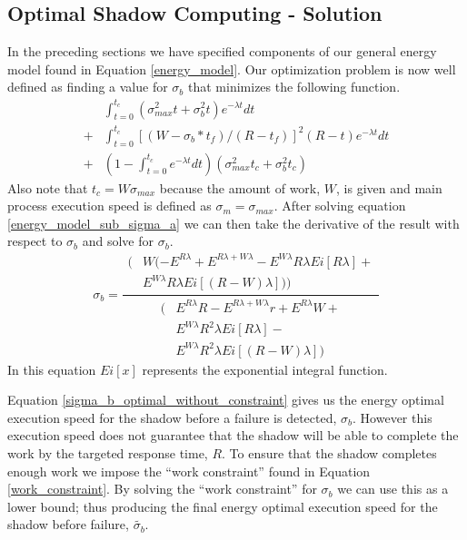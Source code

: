 \subsection{Optimal Shadow Computing - Solution}
\label{closed_form}

In the preceding sections we have specified components of our general
energy model found in Equation \ref{energy_model}. Our optimization
problem is now well defined as finding a value for $\sigma_b$ that
minimizes the following function.
\begin{equation}
\label{energy_model_sub_sigma_a}
\begin{split}
 & \int_{t=0}^{t_c}(\sigma_{max}^2t+\sigma_b^2t) e^{-\lambda t}dt \\
+& \int_{t=0}^{t_c}{[(W-\sigma_b*t_f)/(R-t_f)]}^2 (R-t) e^{-\lambda t}dt \\
+& (1-\int_{t=0}^{t_c} e^{-\lambda t} dt)(\sigma_{max}^2 t_c + \sigma_b^2 t_c)
\end{split}
\end{equation}
Also note that $t_c=W\sigma_{max}$ because the amount of work, $W$, is
given and main process execution speed is defined as
$\sigma_m=\sigma_{max}$. After solving equation
\ref{energy_model_sub_sigma_a} we can then take the derivative of the
result with respect to $\sigma_b$ and solve for $\sigma_b$.
\begin{equation}
\label{sigma_b_optimal_without_constraint}
\sigma_b =\frac{
\begin{split}
(&W  (-E^{R \lambda} + E^{R \lambda + W \lambda} -
  E^{W \lambda} R \lambda Ei[R \lambda] + \\
 &  E^{W \lambda} R \lambda Ei[(R - W) \lambda]))
\end{split}
}
{
\begin{split}
(&E^{R \lambda} R - E^{R \lambda + W \lambda} r + 
 E^{R \lambda} W + \\
 &E^{W \lambda} R^2 \lambda Ei[R \lambda] - \\
 &E^{W \lambda} R^2 \lambda Ei[(R - W) \lambda])
\end{split}
}
\end{equation}
In this equation $Ei[x]$ represents the exponential integral
function. 

Equation \ref{sigma_b_optimal_without_constraint} gives us the energy
optimal execution speed for the shadow before a failure is detected,
$\sigma_b$. However this execution speed does not guarantee that the
shadow will be able to complete the work by the targeted response
time, $R$. To ensure that the shadow completes enough work we impose
the ``work constraint'' found in Equation \ref{work_constraint}. By
solving the ``work constraint'' for $\sigma_b$ we can use this as a
lower bound; thus producing the final energy optimal execution speed
for the shadow before failure, $\tilde{\sigma_b}$.


